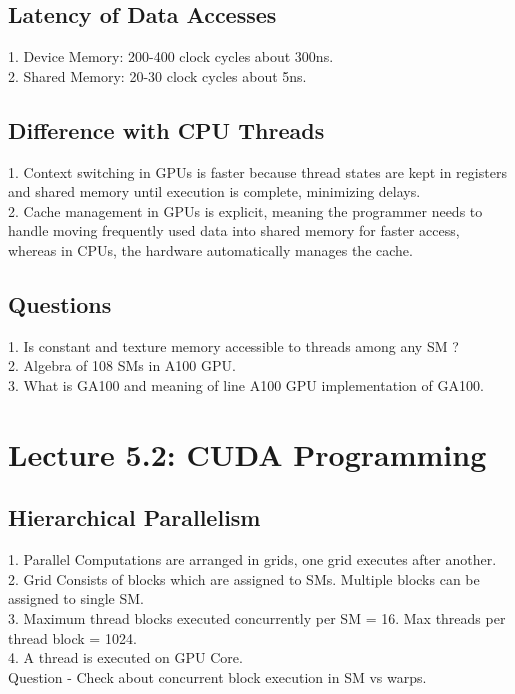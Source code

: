 \documentclass{article}
\begin{document}
\subsection*{Latency of Data Accesses}
1. Device Memory: 200-400 clock cycles about 300ns. \\
2. Shared Memory: 20-30 clock cycles about 5ns. \\

\subsection*{Difference with CPU Threads}
1. Context switching in GPUs is faster because thread states are kept in registers and shared memory until execution is complete, minimizing delays. \\
2. Cache management in GPUs is explicit, meaning the programmer needs to handle moving frequently used data into shared memory for faster access, whereas in CPUs, the hardware automatically manages the cache.

\subsection*{Questions}
1. Is constant and texture memory accessible to threads among any SM ? \\
2. Algebra of 108 SMs in A100 GPU. \\
3. What is GA100 and meaning of line A100 GPU implementation of GA100. \\

\section*{Lecture 5.2: CUDA Programming}
\subsection*{Hierarchical Parallelism}
1. Parallel Computations are arranged in grids, one grid executes after another. \\
2. Grid Consists of blocks which are assigned to SMs. Multiple blocks can be assigned to single SM. \\
3. Maximum thread blocks executed concurrently per SM = 16. Max threads per thread block = 1024. \\
4. A thread is executed on GPU Core. \\

Question - Check about concurrent block execution in SM vs warps. 
\end{document}
